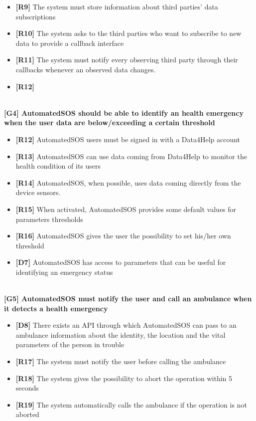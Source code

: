 \begin{itemize}
	\item \textbf{[R9]} The system must store information about third parties' data subscriptions
	\item \textbf{[R10]} The system asks to the third parties who want to subscribe to new data to provide a callback interface
	\item \textbf{[R11]} The system must notify every observing third party through their callbacks whenever an observed data changes.
	\item \textbf{[R12]}
\end{itemize}
\\
\textbf{[G4] AutomatedSOS should be able to identify an health emergency when the user data are below/exceeding a certain threshold}
\begin{itemize}
	\item \textbf{[R12]} AutomatedSOS users must be signed in with a Data4Help account
	\item \textbf{[R13]} AutomatedSOS can use data coming from Data4Help to monitor the health condition of its users
	\item \textbf{[R14]} AutomatedSOS, when possible, uses data coming directly from the device sensors.
	\item \textbf{[R15]} When activated, AutomatedSOS provides some default values for parameters thresholds
	\item \textbf{[R16]} AutomatedSOS gives the user the possibility to set his/her own threshold 
	\item \textbf{[D7]} AutomatedSOS has access to parameters that can be useful for identifying an emergency status
\end{itemize}
\\
\textbf{[G5] AutomatedSOS must notify the user and call an ambulance when it detects a health emergency}
\begin{itemize}
	\item \textbf{[D8]} There exists an API through which AutomatedSOS can pass to an ambulance information about the identity, the location and the vital parameters of the person in trouble
	\item \textbf{[R17]} The system must notify the user before calling the ambulance
	\item \textbf{[R18]} The system gives the possibility to abort the operation within 5 seconds
	\item \textbf{[R19]} The system automatically calls the ambulance if the operation is not aborted
\end{itemize}
